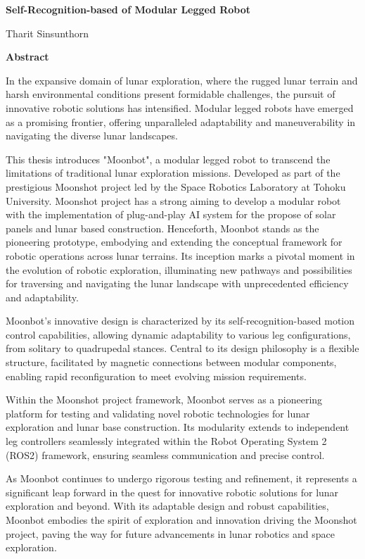 \begin{center}
  {\large \bf Self-Recognition-based of Modular Legged Robot} 
  
  {\large \bf} Tharit Sinsunthorn
\end{center}

\begin{center}
  \LARGE \bf Abstract
\end{center}

In the expansive domain of lunar exploration, where the rugged lunar terrain and harsh environmental conditions present formidable challenges, the pursuit of innovative robotic solutions has intensified. Modular legged robots have emerged as a promising frontier, offering unparalleled adaptability and maneuverability in navigating the diverse lunar landscapes.

This thesis introduces "Moonbot", a modular legged robot to transcend the limitations of traditional lunar exploration missions. Developed as part of the prestigious Moonshot project led by the Space Robotics Laboratory at Tohoku University. Moonshot project has a strong aiming to develop a modular robot with the implementation of plug-and-play AI system for the propose of solar panels and lunar based construction. Henceforth, Moonbot stands as the pioneering prototype, embodying and extending the conceptual framework for robotic operations across lunar terrains. Its inception marks a pivotal moment in the evolution of robotic exploration, illuminating new pathways and possibilities for traversing and navigating the lunar landscape with unprecedented efficiency and adaptability.

Moonbot's innovative design is characterized by its self-recognition-based motion control capabilities, allowing dynamic adaptability to various leg configurations, from solitary to quadrupedal stances. Central to its design philosophy is a flexible structure, facilitated by magnetic connections between modular components, enabling rapid reconfiguration to meet evolving mission requirements.

Within the Moonshot project framework, Moonbot serves as a pioneering platform for testing and validating novel robotic technologies for lunar exploration and lunar base construction. Its modularity extends to independent leg controllers seamlessly integrated within the Robot Operating System 2 (ROS2) framework, ensuring seamless communication and precise control.

As Moonbot continues to undergo rigorous testing and refinement, it represents a significant leap forward in the quest for innovative robotic solutions for lunar exploration and beyond. With its adaptable design and robust capabilities, Moonbot embodies the spirit of exploration and innovation driving the Moonshot project, paving the way for future advancements in lunar robotics and space exploration.

\bigskip



\clearpage




